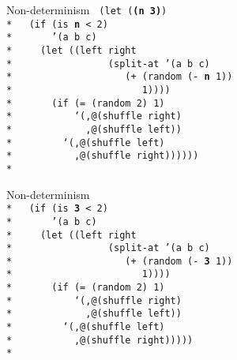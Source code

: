 \begin{frame}{Non-determinism}
  \texttt{
    (let (\textbf{(n 3)})\\*
    \ \ (if (is \textbf{n} < 2)\\*
    \ \ \ \ \ \ '(a b c)\\*
    \ \ \ \ (let ((left right\\*
    \ \ \ \ \ \ \ \ \ \ \ \ \ \ \ \ (split-at '(a b c)\\*
    \ \ \ \ \ \ \ \ \ \ \ \ \ \ \ \ \ \ \ (+ (random (- \textbf{n} 1))\\*
    \ \ \ \ \ \ \ \ \ \ \ \ \ \ \ \ \ \ \ \ \ \ 1))))\\*
    \ \ \ \ \ \ (if (= (random 2) 1)\\*
    \ \ \ \ \ \ \ \ \ \ `(,@(shuffle right)\\*
    \ \ \ \ \ \ \ \ \ \ \ \ ,@(shuffle left))\\*
    \ \ \ \ \ \ \ \ `(,@(shuffle left)\\*
    \ \ \ \ \ \ \ \ \ \ ,@(shuffle right))))))\\*
    \ 
    }
\end{frame}


\begin{frame}{Non-determinism}
  \texttt{
    \ \\*
    \ \ (if (is \textbf{3} < 2)\\*
    \ \ \ \ \ \ '(a b c)\\*
    \ \ \ \ (let ((left right\\*
    \ \ \ \ \ \ \ \ \ \ \ \ \ \ \ \ (split-at '(a b c)\\*
    \ \ \ \ \ \ \ \ \ \ \ \ \ \ \ \ \ \ \ (+ (random (- \textbf{3} 1))\\*
    \ \ \ \ \ \ \ \ \ \ \ \ \ \ \ \ \ \ \ \ \ \ 1))))\\*
    \ \ \ \ \ \ (if (= (random 2) 1)\\*
    \ \ \ \ \ \ \ \ \ \ `(,@(shuffle right)\\*
    \ \ \ \ \ \ \ \ \ \ \ \ ,@(shuffle left))\\*
    \ \ \ \ \ \ \ \ `(,@(shuffle left)\\*
    \ \ \ \ \ \ \ \ \ \ ,@(shuffle right)))))\\*
    \ 
    }
\end{frame}

